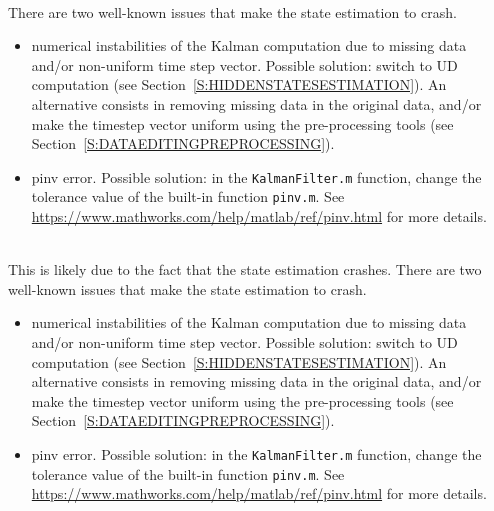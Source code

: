 \begin{description}[style=unboxed]

\item[\textbf{The state estimation crashes. What can I do ?}] \leavevmode \\

There are two well-known issues that make the state estimation to crash.
\begin{itemize}
\item numerical instabilities of the Kalman computation due to missing data and/or non-uniform time step vector. Possible solution: switch to UD computation (see Section~\ref{S:HIDDENSTATESESTIMATION}). An alternative consists in removing missing data in the original data, and/or make the timestep vector uniform using the pre-processing tools (see Section~\ref{S:DATAEDITINGPREPROCESSING}).
\item pinv error. Possible solution: in the \lstinline[basicstyle = \mlttfamily \small ]!KalmanFilter.m! function, change the tolerance value of the built-in \MATLAB{} function  \lstinline[basicstyle = \mlttfamily \small ]!pinv.m!. See \url{https://www.mathworks.com/help/matlab/ref/pinv.html} for more details.
\end{itemize}

\item[\textbf{The model parameter estimation crashes. What can I do ?}] \leavevmode \\
This is likely due to the fact that the state estimation crashes. 
There are two well-known issues that make the state estimation to crash.
\begin{itemize}
\item numerical instabilities of the Kalman computation due to missing data and/or non-uniform time step vector. Possible solution: switch to UD computation (see Section~\ref{S:HIDDENSTATESESTIMATION}). An alternative consists in removing missing data in the original data, and/or make the timestep vector uniform using the pre-processing tools (see Section~\ref{S:DATAEDITINGPREPROCESSING}).
\item pinv error. Possible solution: in the \lstinline[basicstyle = \mlttfamily \small ]!KalmanFilter.m! function, change the tolerance value of the built-in \MATLAB{} function  \lstinline[basicstyle = \mlttfamily \small ]!pinv.m!. See \url{https://www.mathworks.com/help/matlab/ref/pinv.html} for more details.
\end{itemize}


\end{description}
